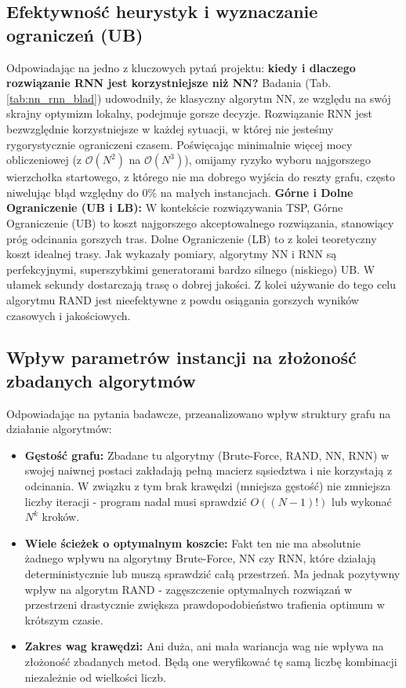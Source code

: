 \documentclass[conference]{IEEEtran}
\begin{document}
        \subsection{Efektywność heurystyk i wyznaczanie ograniczeń (UB)}
            Odpowiadając na jedno z kluczowych pytań projektu: \textbf{kiedy i dlaczego rozwiązanie RNN jest korzystniejsze niż NN?} 
            Badania (Tab. \ref{tab:nn_rnn_blad}) udowodniły, że klasyczny algorytm NN, ze względu na swój skrajny optymizm lokalny, podejmuje gorsze decyzje. Rozwiązanie RNN jest bezwzględnie korzystniejsze w każdej sytuacji, w której nie jesteśmy rygorystycznie ograniczeni czasem. Poświęcając minimalnie więcej mocy obliczeniowej (z $\mathcal{O}(N^2)$ na $\mathcal{O}(N^3)$), omijamy ryzyko wyboru najgorszego wierzchołka startowego, z którego nie ma dobrego wyjścia do reszty grafu, często niwelując błąd względny do $0\%$ na małych instancjach.
            \textbf{Górne i Dolne Ograniczenie (UB i LB):}
            W kontekście rozwiązywania TSP, Górne Ograniczenie (UB) to koszt najgorszego akceptowalnego rozwiązania, stanowiący próg odcinania gorszych tras. Dolne Ograniczenie (LB) to z kolei teoretyczny koszt idealnej trasy. 
            Jak wykazały pomiary, algorytmy NN i RNN są perfekcyjnymi, superszybkimi generatorami bardzo silnego (niskiego) UB. W ułamek sekundy dostarczają trasę o dobrej jakości. Z kolei używanie do tego celu algorytmu RAND jest nieefektywne z powdu osiągania gorszych wyników czasowych i jakościowych.
        \subsection{Wpływ parametrów instancji na złożoność zbadanych algorytmów}
            Odpowiadając na pytania badawcze, przeanalizowano wpływ struktury grafu na działanie algorytmów:
            \begin{itemize}
                \item \textbf{Gęstość grafu:} Zbadane tu algorytmy (Brute-Force, RAND, NN, RNN) w swojej naiwnej postaci zakładają pełną macierz sąsiedztwa i nie korzystają z odcinania. W związku z tym brak krawędzi (mniejsza gęstość) nie zmniejsza liczby iteracji - program nadal musi sprawdzić $O((N-1)!)$ lub wykonać $N^k$ kroków.\\
                \item \textbf{Wiele ścieżek o optymalnym koszcie:} Fakt ten nie ma absolutnie żadnego wpływu na algorytmy Brute-Force, NN czy RNN, które działają deterministycznie lub muszą sprawdzić całą przestrzeń. Ma jednak pozytywny wpływ na algorytm RAND - zagęszczenie optymalnych rozwiązań w przestrzeni drastycznie zwiększa prawdopodobieństwo trafienia optimum w krótszym czasie.
                \item \textbf{Zakres wag krawędzi:} Ani duża, ani mała wariancja wag nie wpływa na złożoność zbadanych metod. Będą one weryfikować tę samą liczbę kombinacji niezależnie od wielkości liczb.
            \end{itemize}
\end{document}
